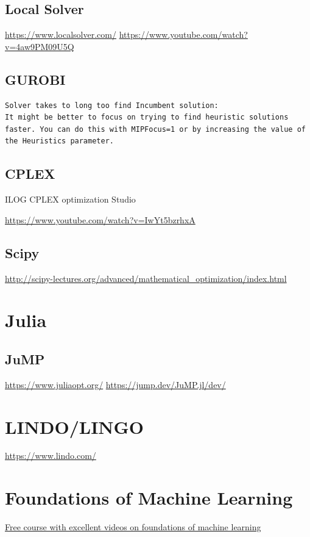 \documentclass[letter,12pt]{book}
\renewcommand{\0}{\mathbf{0}}
\begin{document}
\subsection{Local Solver}

\url{https://www.localsolver.com/}
\url{https://www.youtube.com/watch?v=4aw9PM09U5Q}

\subsection{GUROBI}

\begin{verbatim}
Solver takes to long too find Incumbent solution:
It might be better to focus on trying to find heuristic solutions faster. You can do this with MIPFocus=1 or by increasing the value of the Heuristics parameter.
\end{verbatim}

\subsection{CPLEX}

ILOG CPLEX optimization Studio

\url{https://www.youtube.com/watch?v=IwYt5bzrhxA}



\subsection{Scipy}

\url{http://scipy-lectures.org/advanced/mathematical_optimization/index.html}

\section{Julia}
\subsection{JuMP}
\url{https://www.juliaopt.org/}
\url{https://jump.dev/JuMP.jl/dev/}

\section{LINDO/LINGO}
\url{https://www.lindo.com/}

\section{Foundations of Machine Learning}
\href{https://bloomberg.github.io/foml/#home}{Free course with excellent videos on foundations of machine learning}
\end{document}

